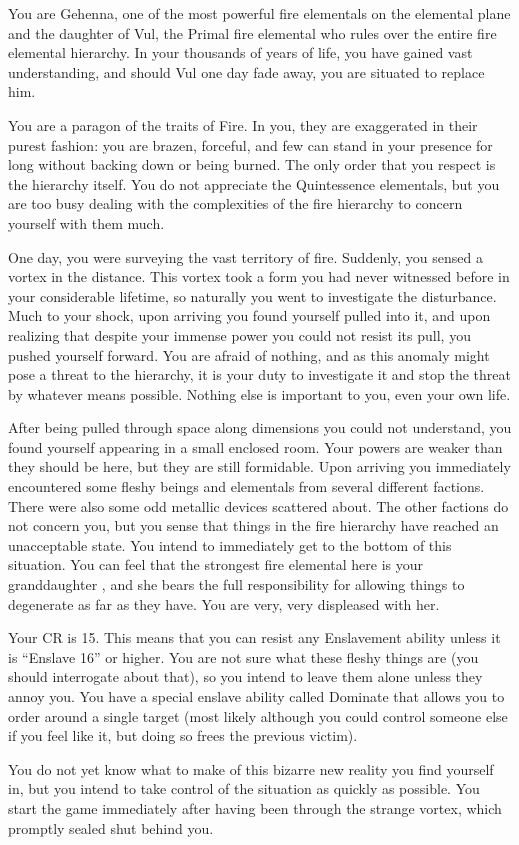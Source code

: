 \documentclass[green]{elementals}
\begin{document}
\name{\cElder{}}

You are Gehenna, one of the most powerful fire elementals on the elemental plane and the daughter of Vul, the Primal fire elemental who rules over the entire fire elemental hierarchy. In your thousands of years of life, you have gained vast understanding, and should Vul one day fade away, you are situated to replace him.

You are a paragon of the traits of Fire. In you, they are exaggerated in their purest fashion: you are brazen, forceful, and few can stand in your presence for long without backing down or being burned. The only order that you respect is the hierarchy itself. You do not appreciate the Quintessence elementals, but you are too busy dealing with the complexities of the fire hierarchy to concern yourself with them much.

One day, you were surveying the vast territory of fire. Suddenly, you sensed a vortex in the distance. This vortex took a form you had never witnessed before in your considerable lifetime, so naturally you went to investigate the disturbance. Much to your shock, upon arriving you found yourself pulled into it, and upon realizing that despite your immense power you could not resist its pull, you pushed yourself forward. You are afraid of nothing, and as this anomaly might pose a threat to the hierarchy, it is your duty to investigate it and stop the threat by whatever means possible. Nothing else is important to you, even your own life.

After being pulled through space along dimensions you could not understand, you found yourself appearing in a small enclosed room. Your powers are weaker than they should be here, but they are still formidable. Upon arriving you immediately encountered some fleshy beings and elementals from several different factions. There were also some odd metallic devices scattered about. The other factions do not concern you, but you sense that things in the fire hierarchy have reached an unacceptable state. You intend to immediately get to the bottom of this situation. You can feel that the strongest fire elemental here is your granddaughter \cQueen{\intro}, and she bears the full responsibility for allowing things to degenerate as far as they have. You are very, very displeased with her.

Your CR is 15. This means that you can resist any Enslavement ability unless it is ``Enslave 16'' or higher. You are not sure what these fleshy things are (you should interrogate \cQueen{} about that), so you intend to leave them alone unless they annoy you. You have a special enslave ability called Dominate that allows you to order around a single target (most likely \cQueen{} although you could control someone else if you feel like it, but doing so frees the previous victim).

You do not yet know what to make of this bizarre new reality you find yourself in, but you intend to take control of the situation as quickly as possible. You start the game immediately after having been through the strange vortex, which promptly sealed shut behind you.
\end{document}
